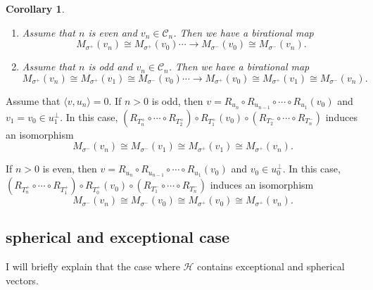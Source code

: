 \documentclass[leqno,11pt]{amsart}
\newtheorem{Cor}[Thm]{Corollary}
\theoremstyle{definition}
\def\CC{\ensuremath{\mathcal C}}
\def\HH{\ensuremath{\mathcal H}}
\begin{document}
\begin{Cor}
\begin{enumerate}
\item[(1)]
Assume that $n$ is even and $v_n \in \CC_n$.
Then we have a birational map
\begin{equation}
M_{\sigma^+}(v_n) \cong M_{\sigma^+}(v_0) \cdots \to M_{\sigma^-}(v_0)
\cong M_{\sigma^-}(v_n).
\end{equation}
\item[(2)]
Assume that $n$ is odd and $v_n \in \CC_n$.
Then we have a birational map
\begin{equation}
M_{\sigma^+}(v_n) \cong M_{\sigma^+}(v_1) \cong M_{\sigma^-}(v_0) 
\cdots \to M_{\sigma^+}(v_0) \cong M_{\sigma^+}(v_1)
\cong M_{\sigma^-}(v_n).
\end{equation}
\end{enumerate}
\end{Cor}

Assume that $\langle v, u_n \rangle=0$.
If $n>0$ is odd, then 
$v= R_{u_n} \circ R_{u_{n-1}} \circ \cdots \circ R_{u_1}(v_0)$ and
$v_1=v_0 \in u_1^\perp$.
In this case, 
$(R_{T_n^+}  \circ \cdots \circ  R_{T_{2}^+}) \circ R_{T_1^+}(v_0)
\circ (R_{T_2^-} \circ \cdots \circ R_{T_n^-})$ induces
an isomorphism
\begin{equation}
M_{\sigma^-}(v_{n}) \cong M_{\sigma^-}(v_1) \cong M_{\sigma^+}(v_1) 
\cong M_{\sigma^+}(v_{n}).
\end{equation}

If $n>0$ is even, then 
$v= R_{u_n} \circ R_{u_{n-1}} \circ \cdots \circ R_{u_1}(v_0)$ and
$v_0 \in u_0^\perp$.
In this case, 
$(R_{T_n^+}  \circ \cdots \circ  R_{T_{1}^+}) \circ R_{T_0^+}(v_0)
\circ (R_{T_1^-} \circ \cdots \circ R_{T_n^-})$ induces
an isomorphism
\begin{equation}
M_{\sigma^-}(v_{n}) \cong M_{\sigma^-}(v_0) \cong M_{\sigma^+}(v_0) 
\cong M_{\sigma^+}(v_{n}).
\end{equation}

 

\subsection{spherical and exceptional case}
I will briefly explain that the case where $\HH$ contains 
exceptional and spherical vectors.
\end{document}
